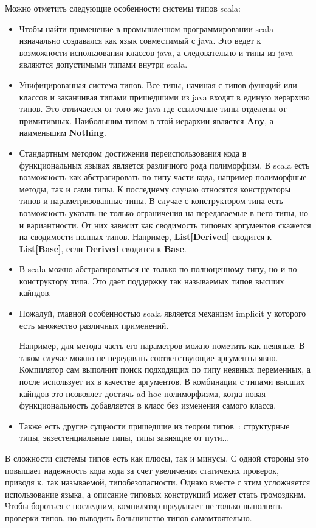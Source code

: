 Можно отметить следующие особенности системы типов scala:
\begin{itemize}
  \item Чтобы найти применение в промышленном программировании scala изначально
  создавался как язык совместимый с java.
  Это ведет к возможности использования классов java, а следовательно и типы
  из java являются допустимыми типами внутри scala.
  \item Унифицированная система типов. Все типы, начиная с типов функций или
  классов и заканчивая типами пришедшими из java входят в единую иерархию типов.
  Это отличается от того же java где ссылочные типы отделены от примитивных.
  Наибольшим типом в этой иерархии является \textbf{Any}, а наименьшим
  \textbf{Nothing}.
  \item Стандартным методом достижения переиспользования кода
  в функциональных языках является различного рода полиморфизм.
  В scala есть возможность как абстрагировать по типу части кода,
  например полиморфные методы, так и сами типы.
  К последнему случаю относятся конструкторы типов и параметризованные типы.
  В случае с конструктором типа есть возможность указать не только ограничения
  на передаваемые в него типы, но и вариантности.
  От них зависит как сводимость типовых аргументов скажется на
  сводимости полных типов.
  Например, \textbf{List[Derived]} сводится к \textbf{List[Base]}, если
  \textbf{Derived} сводится к \textbf{Base}.
  \item В scala можно абстрагироваться не только по полноценному типу,
  но и по конструктору типа.
  Это дает поддержку так называемых типов высших кайндов.
  \item Пожалуй, главной особенностью scala является механизм implicit у которого
  есть множество различных применений.

  Например, для метода часть его параметров можно пометить как неявные.
  В таком случае можно не передавать соответствующие аргументы явно.
  Компилятор сам выполнит поиск подходящих по типу неявных переменных,
  а после использует их в качестве аргументов.
  В комбинации с типами высших кайндов это позвоялет достичь ad-hoc полиморфизма,
  когда новая функциональность добавляется в класс без изменения самого
  класса.
  \item Также есть другие сущности пришедшие из теории типов~\cite{type_theory}:
  структурные типы, экзестенциальные типы, типы завиящие от пути...
\end{itemize}

В сложности системы типов есть как плюсы, так и минусы.
С одной стороны это повышает надежность кода кода за счет увеличения статичеких
проверок, приводя к, так называемой, типобезопасности.
Однако вместе с этим усложняется использование языка, а описание типовых
конструкций может стать громоздким.
Чтобы бороться с последним, компилятор предлагает не только выполнять проверки
типов, но выводить большинство типов самомтоятельно.


